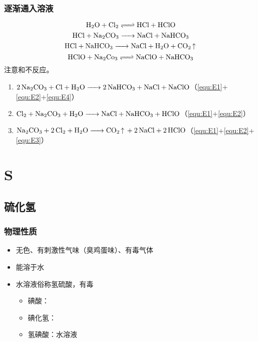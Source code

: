 \documentclass[a4paper]{article}
\begin{document}
	\subsubsection{逐渐通入溶液}
	\begin{equation}\label{equ:E1}
			\ce{H2O + Cl2 <=> HCl + HClO}
	\end{equation}
	\begin{equation}\label{equ:E2}
			\ce{HCl + Na2CO3 -> NaCl + NaHCO3}
	\end{equation}
	\begin{equation}\label{equ:E3}
			\ce{HCl + NaHCO3 -> NaCl + H2O + CO2 ^}
	\end{equation}
	\begin{equation}\label{equ:E4}
			\ce{HClO + Na2Co3 <=> NaClO + NaHCO3}
	\end{equation}
	注意和不反应。
	\begin{enumerate}
		\item $\ce{2Na2CO3 + Cl + H2O -> 2NaHCO3 + NaCl + NaClO}$（\ref{equ:E1}+\ref{equ:E2}+\ref{equ:E4}）
		\item $\ce{Cl2 + Na2CO3 + H2O -> NaCl + NaHCO3 + HClO}$（\ref{equ:E1}+\ref{equ:E2}）
		\item $\ce{Na2CO3 + 2Cl2 + H2O -> CO2 ^ + 2NaCl + 2HClO}$（\ref{equ:E1}+\ref{equ:E2}+\ref{equ:E3}）
	\end{enumerate}
	
	
	
	\newpage
	\section{S}
	
	\subsection{硫化氢}
	\subsubsection{物理性质}
	\begin{itemize}
		\item 无色、有刺激性气味（臭鸡蛋味）、有毒气体
		\item 能溶于水
		\item {}水溶液俗称氢硫酸，有毒
		\begin{itemize}
		\item 碘酸：
		\item 碘化氢：
		\item 氢碘酸：水溶液
		\end{itemize}
	\end{itemize}
\end{document}
